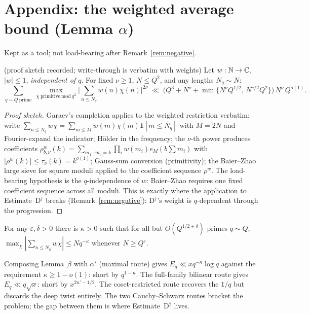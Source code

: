 \section{Appendix: the weighted average bound (Lemma $\alpha$)}
\label{app:alpha}

Kept as a tool; not load-bearing after Remark~\ref{rem:negative}.

\begin{lemma}\label{lem:alpha}
\statusP{} (proof sketch recorded; write-through is verbatim
\cite{Shp11} with weights)\quad
Let $w:\mathbb{N}\to\mathbb{C}$, $|w|\le1$, \emph{independent of $q$}. For fixed
$\nu\ge1$, $N\le Q^2$, and any lengths $N_q\sim N$:
\[
\sum_{q\sim Q\ \mathrm{prime}}\
\max_{\chi\ \mathrm{primitive\ mod}\ q^2}
\Big|\sum_{n\le N_q}w(n)\chi(n)\Big|^{2\nu}
\;\ll\;\Big(Q^{3}+N^{\nu}+\min\big\{N^{\nu}Q^{1/2},\,
N^{\nu/2}Q^{2}\big\}\Big)\,N^{\nu}\,Q^{o(1)} .
\]
\end{lemma}

\begin{proof}[Proof sketch]
Garaev's completion \cite{Gar06} applies to the weighted restriction
verbatim: write
$\sum_{n\le N_q}w\chi=\sum_{m\le M}w(m)\chi(m)\mathbf 1[m\le N_q]$ with
$M=2N$ and Fourier-expand the indicator; H\"older in the frequency; the
$\nu$-th power produces coefficients
$\rho^{w}_{b,\nu}(k)=\sum_{m_1\cdots m_\nu=k}\prod_iw(m_i)e_M(b\sum m_i)$
with $|\rho^{w}(k)|\le\tau_\nu(k)=k^{o(1)}$; Gauss-sum conversion
(primitivity); the Baier--Zhao large sieve for square moduli \cite{BZ08}
applied to the coefficient sequence $\rho^{w}$. The load-bearing
hypothesis is the $q$-independence of $w$: Baier--Zhao requires one fixed
coefficient sequence across all moduli. This is exactly where the
application to Estimate~D$^\dagger$ breaks
(Remark~\ref{rem:negative}): D$^\dagger$'s weight is $q$-dependent
through the progression.
\end{proof}

\begin{corollary}[$\alpha'$]\label{cor:alphaprime}
For any $\varepsilon,\delta>0$ there is $\kappa>0$ such that for all but
$O(Q^{1/2+\delta})$ primes $q\sim Q$,
$\max_\chi|\sum_{n\le N_q}w\chi|\le Nq^{-\kappa}$ whenever
$N\ge Q^{\varepsilon}$.
\end{corollary}

\begin{remark}
Composing Lemma~$\beta$ with $\alpha'$ (maximal route) gives
$E_q\ll xq^{-\kappa}\log q$ against the requirement
$\kappa\ge1-o(1)$: short by $q^{1-\kappa}$. The full-family bilinear
route gives $E_q\ll q\sqrt x$: short by $x^{2u'-1/2}$. The
coset-restricted route recovers the $1/q$ but discards the deep twist
entirely. The two Cauchy--Schwarz routes bracket the problem; the gap
between them is where Estimate~D$^\dagger$ lives.
\end{remark}
